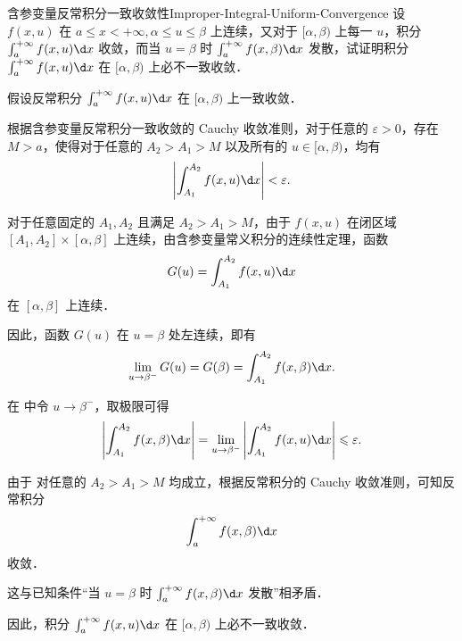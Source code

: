 \begin{problem}{含参变量反常积分一致收敛性}{Improper-Integral-Uniform-Convergence}
    设 $f(x,u)$ 在 $a \leqslant x < +\infty, \alpha \leqslant u \leqslant \beta$ 上连续，又对于 $[\alpha,\beta)$ 上每一 $u$，积分 $\int_a^{+\infty} f(x,u) \d x$ 收敛，而当 $u=\beta$ 时 $\int_a^{+\infty} f(x,\beta) \d x$ 发散，试证明积分 $\int_a^{+\infty} f(x,u) \d x$ 在 $[\alpha,\beta)$ 上必不一致收敛．
\end{problem}

\begin{myproof}
    假设反常积分 $\int_a^{+\infty} f(x,u) \d x$ 在 $[\alpha,\beta)$ 上一致收敛．

    根据含参变量反常积分一致收敛的 Cauchy 收敛准则，对于任意的 $\varepsilon > 0$，存在 $M > a$，使得对于任意的 $A_2 > A_1 > M$ 以及所有的 $u \in [\alpha, \beta)$，均有
    \begin{equation}\label{eq:cauchy-1}
        \left| \int_{A_1}^{A_2} f(x,u) \d x \right| < \varepsilon.
    \end{equation}

    对于任意固定的 $A_1, A_2$ 且满足 $A_2 > A_1 > M$，由于 $f(x,u)$ 在闭区域 $[A_1, A_2] \times [\alpha, \beta]$ 上连续，由含参变量常义积分的连续性定理，函数
    \begin{equation}\label{eq:continuity-2}
        G(u) = \int_{A_1}^{A_2} f(x,u) \d x
    \end{equation}
    在 $[\alpha, \beta]$ 上连续．

    因此，函数 $G(u)$ 在 $u = \beta$ 处左连续，即有
    \begin{equation}
        \lim_{u \to \beta^-} G(u) = G(\beta) = \int_{A_1}^{A_2} f(x,\beta) \d x.
    \end{equation}

    在  中令 $u \to \beta^-$，取极限可得
    \begin{equation}\label{eq:inequality-4}
        \left| \int_{A_1}^{A_2} f(x,\beta) \d x \right| = \lim_{u \to \beta^-} \left| \int_{A_1}^{A_2} f(x,u) \d x \right| \leqslant \varepsilon.
    \end{equation}

    由于  对任意的 $A_2 > A_1 > M$ 均成立，根据反常积分的 Cauchy 收敛准则，可知反常积分
    \begin{equation}\label{eq:convergence-5}
        \int_a^{+\infty} f(x,\beta) \d x
    \end{equation}
    收敛．

    这与已知条件“当 $u=\beta$ 时 $\int_a^{+\infty} f(x,\beta) \d x$ 发散”相矛盾．

    因此，积分 $\int_a^{+\infty} f(x,u) \d x$ 在 $[\alpha,\beta)$ 上必不一致收敛．
\end{myproof}

